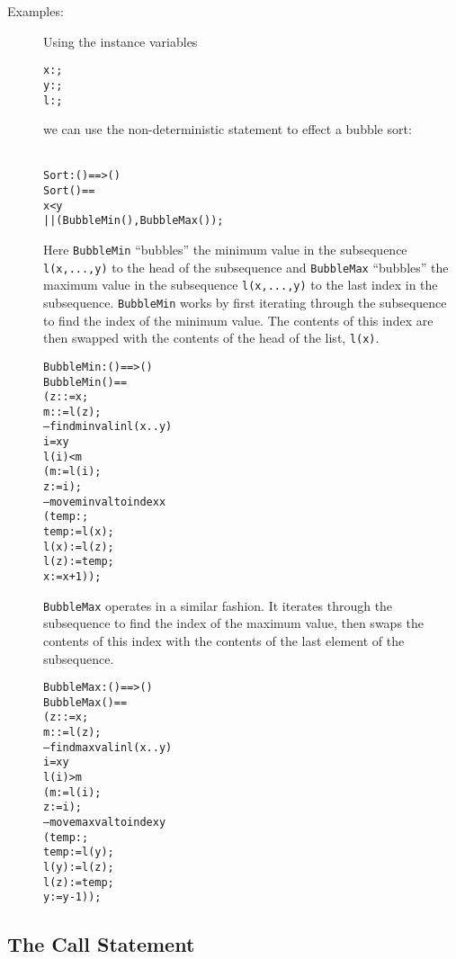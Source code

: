\documentclass[\pformat,12pt]{article}
\begin{document}
\begin{description}
\item[Examples:] Using the 
instance variables
  \begin{alltt}
    x:;
    y:;
    l:;
  \end{alltt}
  we can use the non-deterministic statement to effect a bubble sort:
  \begin{alltt}\label{sortDef}
  Sort: () ==> ()
  Sort () ==
     x < y 
      ||(BubbleMin(), BubbleMax());
  \end{alltt}
  Here \texttt{BubbleMin} ``bubbles'' the minimum value in the
  subsequence \texttt{l(x,...,y)} to the head of the subsequence and
  \texttt{BubbleMax} ``bubbles'' the maximum value in the subsequence
  \texttt{l(x,...,y)} to the last index in the
  subsequence. \texttt{BubbleMin} works by first iterating through the
  subsequence to find the index of the minimum value. The contents of
  this index are then swapped with the contents of the head of the
  list, \texttt{l(x)}.
  \begin{alltt}
  BubbleMin : () ==> ()
  BubbleMin () ==
    ( z: := x;
      m: := l(z);
     -- find min val in l(x..y)
      i = x  y 
        l(i) < m
        ( m := l(i);
              z := i);
     -- move min val to index x
     ( temp:;
      temp := l(x);
      l(x) := l(z);
      l(z) := temp;
      x := x+1));
\end{alltt}
\texttt{BubbleMax} operates in a similar fashion. It iterates through the
  subsequence to find the index of the maximum value, then swaps the
  contents of this index with the contents of the last element of the
  subsequence. 
\begin{alltt}
  BubbleMax : () ==> ()
  BubbleMax () ==
    ( z: := x;
      m: := l(z);
     -- find max val in l(x..y)
      i = x  y 
        l(i) > m
        ( m := l(i);
              z := i);
     -- move max val to index y
     ( temp:;
      temp := l(y);
      l(y) := l(z);
      l(z) := temp;
      y := y-1));
  \end{alltt}
\end{description}

\subsection{The Call Statement}
\label{call-stmt}
\end{document}
